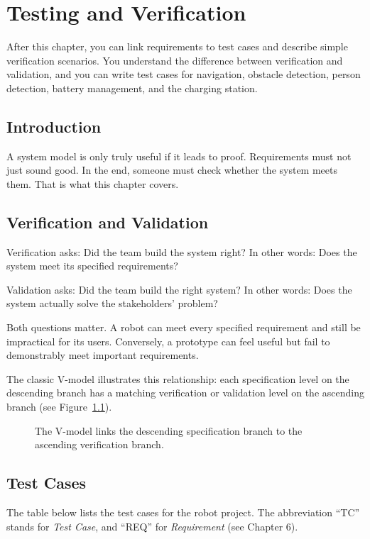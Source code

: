 \chapter{Testing and Verification}

\begin{lernziele}
After this chapter, you can link requirements to test cases and describe simple verification scenarios. You understand the difference between verification and validation, and you can write test cases for navigation, obstacle detection, person detection, battery management, and the charging station.
\end{lernziele}

\section{Introduction}
A system model is only truly useful if it leads to proof. Requirements must not just sound good. In the end, someone must check whether the system meets them. That is what this chapter covers.

\section{Verification and Validation}
Verification asks: Did the team build the system right? In other words: Does the system meet its specified requirements?

Validation asks: Did the team build the right system? In other words: Does the system actually solve the stakeholders' problem?

Both questions matter. A robot can meet every specified requirement and still be impractical for its users. Conversely, a prototype can feel useful but fail to demonstrably meet important requirements.

The classic V-model illustrates this relationship: each specification level on the descending branch has a matching verification or validation level on the ascending branch (see Figure~\ref{fig:kap19-v-modell}).

\begin{figure}[H]
  \centering
  \caption{The V-model links the descending specification branch to the ascending verification branch.}
  \label{fig:kap19-v-modell}
\end{figure}

\section{Test Cases}
The table below lists the test cases for the robot project. The abbreviation \enquote{TC} stands for \emph{Test Case}, and \enquote{REQ} for \emph{Requirement} (see Chapter 6).

